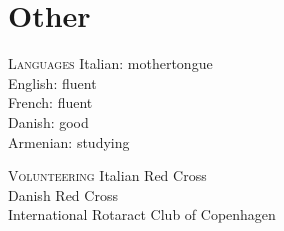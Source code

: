 \section*{Other}

\begin{paracol}{2}
  \textsc{Languages}
\switchcolumn
  Italian: mothertongue\\
  English: fluent\\
  French: fluent\\
  Danish: good\\
  Armenian: studying
\end{paracol}

\vspace{1em}

\begin{paracol}{2}
  \textsc{Volunteering}
\switchcolumn
  Italian Red Cross\\
  Danish Red Cross\\
  International Rotaract Club of Copenhagen
\end{paracol}